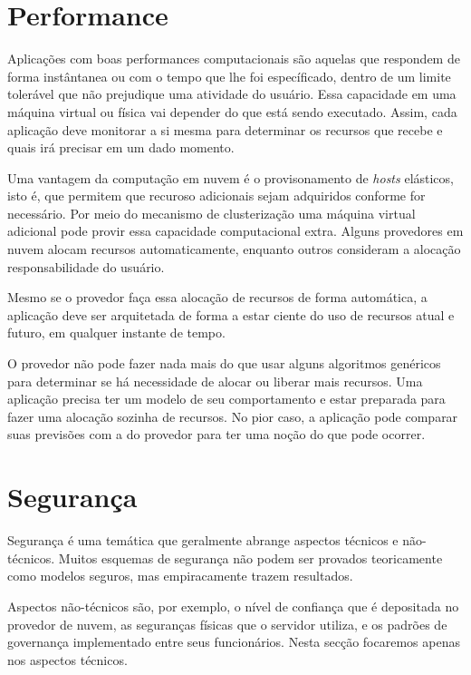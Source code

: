 \section{Performance}

Aplicações com boas performances computacionais são aquelas que respondem de forma instântanea ou com o tempo que lhe foi específicado, dentro de um limite tolerável que não prejudique uma atividade do usuário. Essa capacidade em uma máquina virtual ou física vai depender do que está sendo executado. Assim, cada aplicação deve monitorar a si mesma para determinar os recursos que recebe e quais irá precisar em um dado momento.

Uma vantagem da computação em nuvem é o provisonamento de \textit{hosts} elásticos, isto é, que permitem que recuroso adicionais sejam adquiridos conforme for necessário. Por meio do mecanismo de clusterização uma máquina virtual adicional pode provir essa capacidade computacional extra. Alguns provedores em nuvem alocam recursos automaticamente, enquanto outros consideram a alocação responsabilidade do usuário.

Mesmo se o provedor faça essa alocação de recursos de forma automática, a aplicação deve ser arquitetada de forma a estar ciente do uso de recursos atual e futuro, em qualquer instante de tempo. 

O provedor não pode fazer nada mais do que usar alguns algoritmos genéricos para determinar se há necessidade de alocar ou liberar mais recursos. Uma aplicação precisa ter um modelo de seu comportamento e estar preparada para fazer uma alocação sozinha de recursos. No pior caso, a aplicação pode comparar suas previsões com a do provedor para ter uma noção do que pode ocorrer.


\section{Segurança}
Segurança é uma temática que geralmente abrange aspectos técnicos e não-técnicos. Muitos esquemas de segurança não podem ser provados teoricamente como modelos seguros, mas empiracamente trazem resultados.

Aspectos não-técnicos são, por exemplo, o nível de confiança que é depositada no provedor de nuvem, as seguranças físicas que o servidor utiliza, e os padrões de governança implementado entre seus funcionários. Nesta secção focaremos apenas nos aspectos técnicos.

\iffalse
Applications in the cloud are accessed over the Internet using standard Internet protocols. 
The security and privacy issues deriving from the use of the Internet are substantial but no different from the security issues faced by applications not hosted in the cloud. The one significant security element introduced by the cloud is multi-tenancy. Multi-tenancy means that your application is utilizing a virtual machine on a physical computer that is hosting multiple virtual machines. If one of the other tenants on your machine is malicious, what damage can they do to you?
\fi

